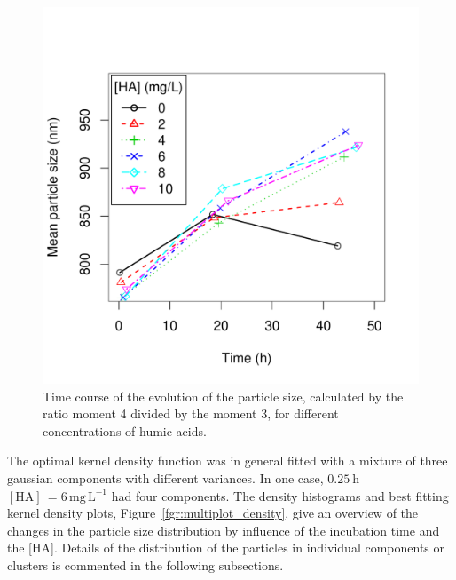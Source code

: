 \documentclass[journal=langd5,manuscript=article]{achemso}
\begin{document}
 \begin{figure}
  \includegraphics[width=\linewidth]{Figures/mean_particle_size.pdf}
  \caption{Time course of the evolution of the particle size, calculated by the  ratio moment 4 divided by the moment 3, for different concentrations of humic acids.} 
  \label{fgr:meansize}
\end{figure}






The optimal  kernel density function was in general fitted with a mixture of three gaussian components with different variances.
In one case,
$0.25~\mathrm{h}$
$\mathrm{[HA]\, = 6\, mg\,L^{-1}}$ had four components. The density histograms and best fitting  kernel density plots,
Figure~\ref{fgr:multiplot_density},
give an overview  of the changes in the particle size distribution by influence of the 
incubation time and the [HA]. 
Details of the distribution of the particles in  individual components or clusters is commented in the following subsections.
\end{document}

